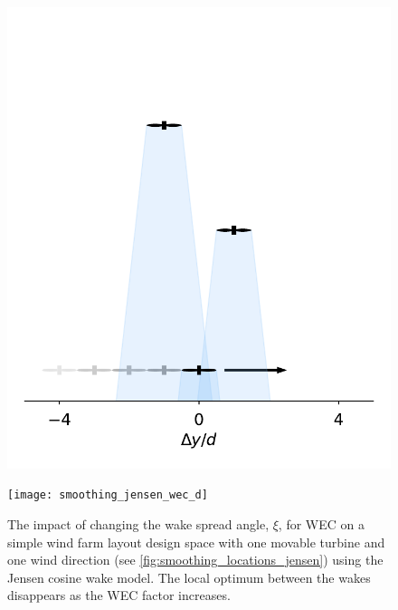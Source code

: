 \documentclass{jpconf}
\begin{document}
\begin{figure}[ht]
	\centering
	\begin{minipage}[t]{0.43\textwidth}
		\centering
		\includegraphics[width=\textwidth, trim={-0.5cm -0.5cm -0.5cm 3.25cm}, clip]{final_images/layouts/3turb-design-space}
		\caption{Simple wind farm, seen from above, used to demonstrate the effects of the WEC factor $\xi$, on the wind farm layout design space (see \cref{fig:smoothing_jensen_wec_d}). Wind is from the top.}
		\label{fig:smoothing_locations_jensen}
	\end{minipage}\hspace{1pc}
	\begin{minipage}[t]{0.52\textwidth}
		\centering
		\texttt{[image: smoothing\_jensen\_wec\_d]}
		\caption{The impact of changing the wake spread angle, $\xi$, for WEC on a simple wind farm layout design space with one movable turbine and one wind direction (see \cref{fig:smoothing_locations_jensen}) using the Jensen cosine wake model. The local optimum between the wakes disappears as the WEC factor increases.}
		\label{fig:smoothing_jensen_wec_d}
	\end{minipage}
\end{figure}
\end{document}
